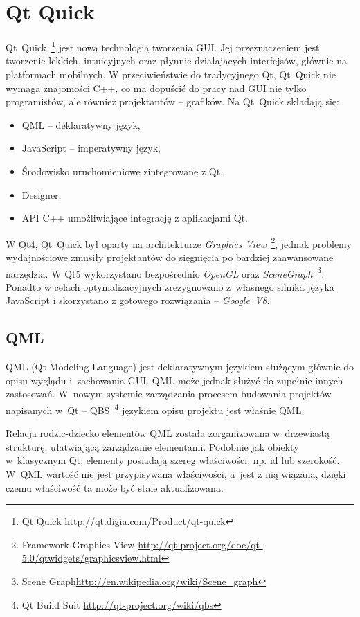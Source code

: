 \section{Qt Quick}
Qt~Quick~\footnote{Qt Quick \url{http://qt.digia.com/Product/qt-quick}} jest nową technologią tworzenia GUI. Jej przeznaczeniem jest tworzenie lekkich, intuicyjnych oraz płynnie działających interfejsów, głównie na platformach mobilnych. W przeciwieństwie do tradycyjnego Qt, Qt~Quick nie wymaga znajomości C++, co ma dopuścić do pracy nad GUI nie tylko programistów, ale również projektantów -- grafików.
Na Qt~Quick składają się:
\begin{itemize}
\item QML -- deklaratywny język,
\item JavaScript -- imperatywny język,
\item Środowisko uruchomieniowe zintegrowane z Qt,
\item Designer,
\item API C++ umożliwiające integrację z aplikacjami Qt.
\end{itemize}

W Qt4, Qt~Quick był oparty na architekturze \textit{Graphics View}~\footnote{Framework Graphics View  \url{http://qt-project.org/doc/qt-5.0/qtwidgets/graphicsview.html}}, jednak problemy wydajnościowe zmusiły projektantów do sięgnięcia po bardziej zaawansowane narzędzia. W Qt5 wykorzystano bezpośrednio \textit{OpenGL} oraz \textit{SceneGraph}~\footnote{Scene Graph\url{http://en.wikipedia.org/wiki/Scene\_graph}}. Ponadto w celach optymalizacyjnych zrezygnowano z~własnego silnika języka JavaScript i skorzystano z gotowego rozwiązania -- \textit{Google~V8}.

\subsection{QML}
QML (Qt Modeling Language) jest deklaratywnym językiem służącym głównie do opisu wyglądu i~zachowania GUI. QML może jednak służyć do zupełnie innych zastosowań. W~nowym systemie zarządzania procesem budowania projektów napisanych w~Qt -- QBS~\footnote{Qt Build Suit \url{http://qt-project.org/wiki/qbs}} językiem opisu projektu jest właśnie QML.

Relacja rodzic-dziecko elementów QML została zorganizowana w~drzewiastą strukturę, ułatwiającą zarządzanie elementami. Podobnie jak obiekty w~klasycznym Qt, elementy posiadają szereg właściwości, np. id lub szerokość. W~QML wartość nie jest przypisywana właściwości, a~jest z nią wiązana, dzięki czemu właściwość ta może być stale aktualizowana.

